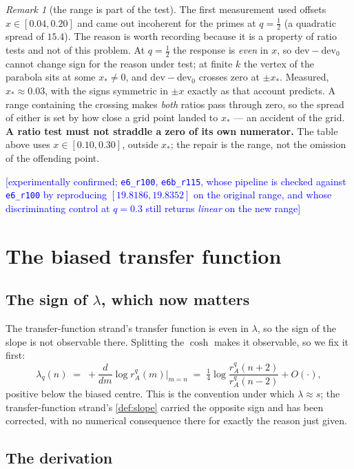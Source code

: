\documentclass[11pt,a4paper]{article}
\theoremstyle{plain}
\theoremstyle{definition}
\theoremstyle{remark}
\newtheorem{remark}[theorem]{Remark}
\newcommand{\STATUS}[1]{\textcolor{blue}{\textsf{[#1]}}}
\begin{document}
\begin{remark}[the range is part of the test]\label{rem:range}
The first measurement used offsets $x\in[0.04,0.20]$ and came out incoherent for the primes at
$q=\tfrac12$ (a quadratic spread of $15.4$). The reason is worth recording because it is a
property of ratio tests and not of this problem. At $q=\tfrac12$ the response is \emph{even} in
$x$, so $\mathrm{dev}-\mathrm{dev}_0$ cannot change sign for the reason under test; at finite
$k$ the vertex of the parabola sits at some $x_*\ne0$, and $\mathrm{dev}-\mathrm{dev}_0$ crosses
zero at $\pm x_*$. Measured, $x_*\approx0.03$, with the signs symmetric in $\pm x$ exactly as
that account predicts. A range containing the crossing makes \emph{both} ratios pass through
zero, so the spread of either is set by how close a grid point landed to $x_*$ --- an accident
of the grid. \textbf{A ratio test must not straddle a zero of its own numerator.} The table
above uses $x\in[0.10,0.30]$, outside $x_*$; the repair is the range, not the omission of the
offending point.
\end{remark}
\STATUS{experimentally confirmed; \texttt{e6\_r100}, \texttt{e6b\_r115}, whose pipeline is
checked against \texttt{e6\_r100} by reproducing $[19.8186,19.8352]$ on the original range, and
whose discriminating control at $q=0.3$ still returns \emph{linear} on the new range}

\section{The biased transfer function}\label{sec:phiq}

\subsection{The sign of $\lambda$, which now matters}

The transfer-function strand's transfer function is even in $\lambda$, so the sign of the slope is not observable
there. Splitting the $\cosh$ makes it observable, so we fix it first:
\[
  \lambda_q(n)\;=\;+\frac{d}{dm}\log r^{q}_A(m)\Big|_{m=n}
  \;=\;\tfrac14\log\frac{r^{q}_A(n+2)}{r^{q}_A(n-2)}+O(\cdot),
\]
positive below the biased centre. This is the convention under which $\lambda\approx s$;
the transfer-function strand's \ref{def:slope} carried the opposite sign and has been corrected, with no
numerical consequence there for exactly the reason just given.

\subsection{The derivation}
\end{document}
